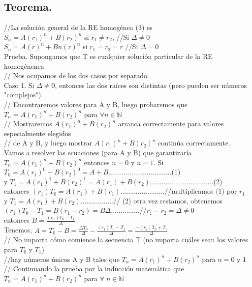 \documentclass{article}
\begin{document}
\subsection{Teorema.}
//La solución general de la RE homogénea (3) es\\

$S_n = A(r_1)^n + B(r_2)^n$ si $r_1 \neq r_2$,  //Si $\Delta \neq 0$\\
$S_n = A(r)^n + Bn(r)^n$ si $r_1 = r_2 = r$ //Si $\Delta = 0$\\

Prueba. Supongamos que T es cualquier solución particular de la RE homogénenea\\
// Nos ocupamos de los dos casos por separado.\\

Caso 1. Si $\Delta \neq 0$, entonces las dos raíces son distintas (pero pueden ser números "complejos").\\

// Encontraremos valores para A y B, luego probaremos que $T_n = A(r_1)^n + B(r_2)^n$ para $\forall n \in \mathbb{N}$\\
// Mostraremos $A(r_1)^n + B(r_2)^n$ arranca correctamente para valores especialmente elegidos\\
// de A y B, y luego mostrar $A(r_1)^n + B(r_2)^n$ continúa correctamente.\\

Vamos a resolver las ecuaciones (para A y B) que garantizaría $T_n = A(r_1)^n + B(r_2)^n$ entonces $n=0$ y $n=1$. Si\\

$T_0 = A(r_1)^0 + B(r_2)^0 = A + B$.................................(1)\\
 y $T_1 = A(r_1)^1 + B(r_2)^1 = A(r_1) + B(r_2)$.................................(2)\\
 
entonces $(r_1)T_0 = A(r_1) + B(r_1)$.......................//multiplicamos (1) por $r_1$\\
y $T_1 = A(r_1) + B(r_2)$.................// (2) otra vez restamos, obtenemos\\

$(r_1)T_0 - T_1 = B(r_1 - r_2) = B\Delta$...............//$r_1 - r_2 = \Delta \neq 0$\\

entonces $B = \frac{(r_1)T_0 - T_1}{\Delta}$\\

Tenemos, $A=T_0 - B =\frac{\Delta T_0}{\Delta} -\frac{(r_1)T_0 - T_1}{\Delta} = \frac{-(r_2)T_0+T_1}{\Delta}$\\
// No importa cómo comience la secuencia T (no importa cuáles sean los valores para $T_0$ y $T_1$)\\
//hay números únicos A y B tales que $T_n = A(r_1)^n + B(r_2)^n$ para $n = 0$ y 1\\
// Continuando la prueba por la inducción matemática que $T_n= A(r_1)^n + B(r_2)^n$ para $\forall \; n \in \mathbb{N}$\\
\end{document}
